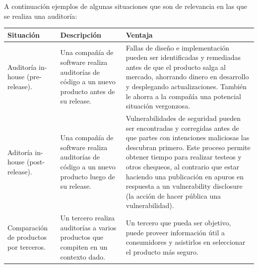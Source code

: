 A continuación ejemplos de algunas situaciones que son de relevancia en las que se realiza una auditoría:\newline

\begin{tabular}{|p{4.3cm}|p{4.3cm}|p{4.3cm}|}
    \hline
    \textbf{Situación} & \textbf{Descripción} & \textbf{Ventaja} \\
    \hline
    Auditoría in-house (pre-release). & Una compañía de software realiza auditorías de código a un nuevo producto antes de su release. & Fallas de diseño e implementación pueden ser identificadas y remediadas antes de que el producto salga al mercado, ahorrando dinero en desarrollo y desplegando actualizaciones. También le ahorra a la compañía una potencial situación vergonzosa. \\
    \hline
    Aditoría in-house (post-release). & Una compañía de software realiza auditorías de código a un nuevo producto luego de su release. & 
    Vulnerabilidades de seguridad pueden ser encontradas y corregidas antes de que partes con intenciones maliciosas las descubran primero. Este proceso permite obtener tiempo para realizar testeos y otros chequeos, al contrario que estar haciendo una publicación en apuros en respuesta a un vulnerability disclosure (la acción de hacer pública una vulnerabilidad). \\
    \hline
    Comparación de productos por terceros. & Un tercero realiza auditorías a varios productos que compiten en un contexto dado. & Un tercero que pueda ser objetivo, puede proveer información útil a consumidores y asistirlos en seleccionar el producto más seguro. \\
    \hline
\end{tabular}
\pagebreak


